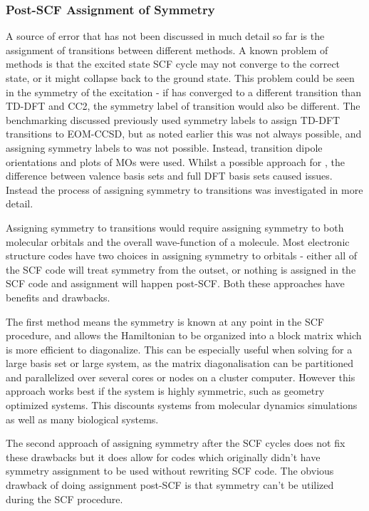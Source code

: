 \subsubsection{Post-SCF Assignment of Symmetry}
\label{subsubsec:post_scf_symmetry}

A source of error that has not been discussed in much detail so far is the assignment
of transitions between different methods. A known problem of \dscf methods is that
the excited state SCF cycle may not converge to the correct state, or it might
collapse back to the ground state. This problem could be seen in the symmetry of
the excitation - if \dscf has converged to a different transition than TD-DFT and 
CC2, the symmetry label of transition would also be different. The benchmarking
discussed previously used symmetry labels to assign TD-DFT transitions to EOM-CCSD, 
but as noted earlier this was not always possible, and assigning symmetry labels 
to \dscf was not possible. Instead, transition dipole orientations and plots of 
MOs were used. Whilst a possible approach for \dxtb, the difference between \dxtb 
valence basis sets and full DFT basis sets caused issues. Instead the process of
assigning symmetry to \dscf transitions was investigated in more detail.

Assigning symmetry to \dscf transitions would require assigning symmetry to both
molecular orbitals and the overall wave-function of a molecule. Most electronic 
structure codes have two choices in assigning symmetry to orbitals - either all
of the SCF code will treat symmetry from the outset, or nothing is assigned in the
SCF code and assignment will happen post-SCF. Both these approaches have benefits
and drawbacks.

The first method means the symmetry is known at any point in the SCF procedure,
and allows the Hamiltonian to be organized into a block matrix which is more efficient
to diagonalize. This can be especially useful when solving for a large basis set 
or large system, as the matrix diagonalisation can be partitioned and parallelized 
over several cores or nodes on a cluster computer. However this approach works best 
if the system is highly symmetric, such as geometry optimized systems. This discounts
systems from molecular dynamics simulations as well as many biological systems.

The second approach of assigning symmetry after the SCF cycles does not fix these
drawbacks but it does allow for codes which originally didn't have symmetry assignment
to be used without rewriting SCF code. The obvious drawback of doing assignment 
post-SCF is that symmetry can't be utilized during the SCF procedure.

